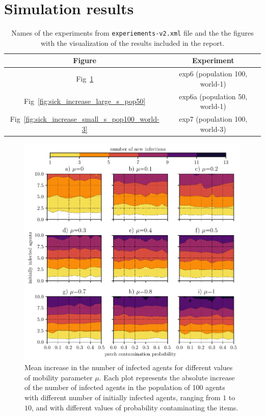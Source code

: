 \documentclass[10pt,a4paper]{article}
\begin{document}
\section{Simulation results}

\begin{table}[ht!]
\centering
\begin{tabular}{|c|c|}
\hline
\textbf{Figure} & \textbf{Experiment} \\
\hline
Fig~\ref{fig:sick_increase_large_s_pop100} & exp6  (population 100, world-1)\\
\hline
Fig~\ref{fig:sick_increase_large_s_pop50} & exp6a (population 50, world-1)\\ 
\hline
Fig~\ref{fig:sick_increase_small_s_pop100_world-3} & exp7 (population 100, world-3) \\
\hline
\end{tabular}
\caption{Names of the experiments from \texttt{experiements-v2.xml} file and the the figures with the visualization of the results included in the report.}
\end{table}


\begin{figure}[ht!]
\begin{center}
\includegraphics[scale=0.75]{plots/sick_increase_large_s_pop100.pdf}
\end{center}
\caption{Mean increase in the number of infected agents for different values of mobility parameter $\mu$. Each plot represents the absolute increase of the number of infected agents in the population of 100 agents with different number of initially infected agents, ranging from $1$ to $10$,  and with different values of probability contaminating the items.}
\label{fig:sick_increase_large_s_pop100}
\end{figure}
\end{document}
